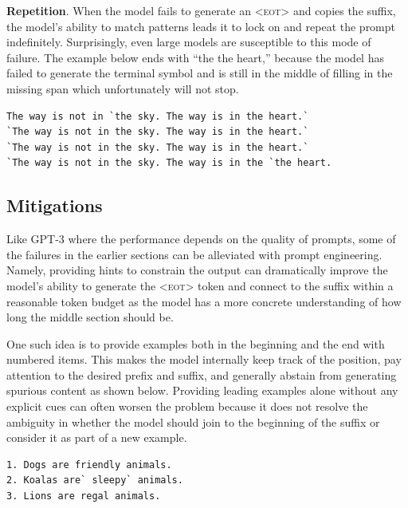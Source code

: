 \documentclass[postscript]{article}
\begin{document}
\textbf{Repetition}. When the model fails to generate an \textsc{<eot>} and copies the suffix, the model's ability to match patterns leads it to lock on and repeat the prompt indefinitely. Surprisingly, even large models are susceptible to this mode of failure. The example below ends with ``\textsf{\small the the heart,}'' because the model has failed to generate the terminal symbol and is still in the middle of filling in the missing span which unfortunately will not stop.

\vspace{-6pt}
\begin{center}
\begin{minipage}{5in}
\begin{lstlisting}[style=text]
The way is not in `the sky. The way is in the heart.`
`The way is not in the sky. The way is in the heart.`
`The way is not in the sky. The way is in the heart.`
`The way is not in the sky. The way is in the `the heart.
\end{lstlisting}
\end{minipage}
\end{center}
\vspace{-3pt}


\subsection{Mitigations}
\label{sec:qual:mitigations}

Like GPT-3 \citep{gpt3} where the performance depends on the quality of prompts, some of the failures in the earlier sections can be alleviated with prompt engineering. Namely, providing hints to constrain the output can dramatically improve the model's ability to generate the \textsc{<eot>} token and connect to the suffix within a reasonable token budget as the model has a more concrete understanding of how long the middle section should be.

One such idea is to provide examples both in the beginning and the end with numbered items. This makes the model internally keep track of the position, pay attention to the desired prefix and suffix, and generally abstain from generating spurious content as shown below. Providing leading examples alone without any explicit cues can often worsen the problem because it does not resolve the ambiguity in whether the model should join to the beginning of the suffix or consider it as part of a new example.

\vspace{-6pt}
\begin{center}
\begin{minipage}{5in}
\begin{lstlisting}[style=text]
1. Dogs are friendly animals.
2. Koalas are` sleepy` animals.
3. Lions are regal animals.
\end{lstlisting}
\end{minipage}
\end{center}
\end{document}
